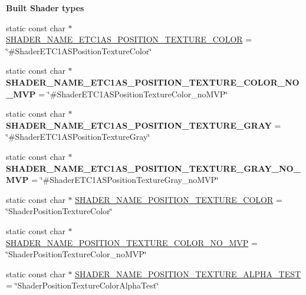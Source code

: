 \begin{Indent}\textbf{ Built Shader types}\par
\begin{DoxyCompactItemize}
\item 
static const char $\ast$ \hyperlink{classGLProgram_af82fde5ba5494620c2b78bcbde49e082}{S\+H\+A\+D\+E\+R\+\_\+\+N\+A\+M\+E\+\_\+\+E\+T\+C1\+A\+S\+\_\+\+P\+O\+S\+I\+T\+I\+O\+N\+\_\+\+T\+E\+X\+T\+U\+R\+E\+\_\+\+C\+O\+L\+OR} = \char`\"{}\#Shader\+E\+T\+C1\+A\+S\+Position\+Texture\+Color\char`\"{}
\item 
\mbox{\label{classGLProgram_af64f082231bf3d77d2f7197fff563a5f}} 
static const char $\ast$ {\bfseries S\+H\+A\+D\+E\+R\+\_\+\+N\+A\+M\+E\+\_\+\+E\+T\+C1\+A\+S\+\_\+\+P\+O\+S\+I\+T\+I\+O\+N\+\_\+\+T\+E\+X\+T\+U\+R\+E\+\_\+\+C\+O\+L\+O\+R\+\_\+\+N\+O\+\_\+\+M\+VP} = \char`\"{}\#Shader\+E\+T\+C1\+A\+S\+Position\+Texture\+Color\+\_\+no\+M\+VP\char`\"{}
\item 
\mbox{\label{classGLProgram_a3fc9ca3d71767bfab6f126fdcff2db91}} 
static const char $\ast$ {\bfseries S\+H\+A\+D\+E\+R\+\_\+\+N\+A\+M\+E\+\_\+\+E\+T\+C1\+A\+S\+\_\+\+P\+O\+S\+I\+T\+I\+O\+N\+\_\+\+T\+E\+X\+T\+U\+R\+E\+\_\+\+G\+R\+AY} = \char`\"{}\#Shader\+E\+T\+C1\+A\+S\+Position\+Texture\+Gray\char`\"{}
\item 
\mbox{\label{classGLProgram_aa1735fce39b2161d978fd5c89d2d7477}} 
static const char $\ast$ {\bfseries S\+H\+A\+D\+E\+R\+\_\+\+N\+A\+M\+E\+\_\+\+E\+T\+C1\+A\+S\+\_\+\+P\+O\+S\+I\+T\+I\+O\+N\+\_\+\+T\+E\+X\+T\+U\+R\+E\+\_\+\+G\+R\+A\+Y\+\_\+\+N\+O\+\_\+\+M\+VP} = \char`\"{}\#Shader\+E\+T\+C1\+A\+S\+Position\+Texture\+Gray\+\_\+no\+M\+VP\char`\"{}
\item 
static const char $\ast$ \hyperlink{classGLProgram_a7f7e223328336e8792add8633171aa96}{S\+H\+A\+D\+E\+R\+\_\+\+N\+A\+M\+E\+\_\+\+P\+O\+S\+I\+T\+I\+O\+N\+\_\+\+T\+E\+X\+T\+U\+R\+E\+\_\+\+C\+O\+L\+OR} = \char`\"{}Shader\+Position\+Texture\+Color\char`\"{}
\item 
static const char $\ast$ \hyperlink{classGLProgram_a399006f411ca943d744a8167023df7e6}{S\+H\+A\+D\+E\+R\+\_\+\+N\+A\+M\+E\+\_\+\+P\+O\+S\+I\+T\+I\+O\+N\+\_\+\+T\+E\+X\+T\+U\+R\+E\+\_\+\+C\+O\+L\+O\+R\+\_\+\+N\+O\+\_\+\+M\+VP} = \char`\"{}Shader\+Position\+Texture\+Color\+\_\+no\+M\+VP\char`\"{}
\item 
static const char $\ast$ \hyperlink{classGLProgram_a2f88a85f28275be2048f1b79c8553412}{S\+H\+A\+D\+E\+R\+\_\+\+N\+A\+M\+E\+\_\+\+P\+O\+S\+I\+T\+I\+O\+N\+\_\+\+T\+E\+X\+T\+U\+R\+E\+\_\+\+A\+L\+P\+H\+A\+\_\+\+T\+E\+ST} = \char`\"{}Shader\+Position\+Texture\+Color\+Alpha\+Test\char`\"{}

\end{DoxyCompactItemize}
\end{Indent}
